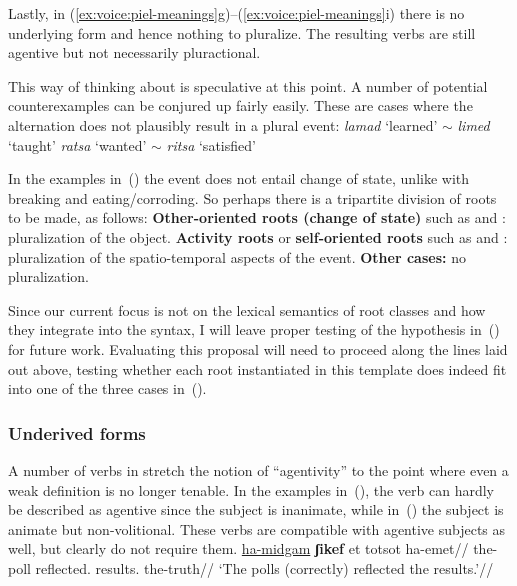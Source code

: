{Lastly, in (\ref{ex:voice:piel-meanings}g)--(\ref{ex:voice:piel-meanings}i) there is no underlying form and hence nothing to pluralize. The resulting verbs are still agentive but not necessarily pluractional.

This way of thinking about {\tpie} is speculative at this point. A number of potential counterexamples can be conjured up fairly easily. These are cases where the alternation does not plausibly result in a plural event:
\pex
	\a \emph{lamad} `learned' $\sim$ \emph{limed} `taught'
	\a \emph{ratsa} `wanted' $\sim$ \emph{ritsa} `satisfied'
\xe

In the examples in~(\lastx) the event does not entail change of state, unlike with breaking and eating/corroding. So perhaps there is a tripartite division of roots to be made, as follows:
\pex
	\a \textbf{Other-oriented roots (change of state)} such as  and : pluralization of the object.
	\a \textbf{Activity roots} or \textbf{self-oriented roots} such as  and : pluralization of the spatio-temporal aspects of the event.
	\a \textbf{Other cases:} no pluralization.
\xe

Since our current focus is not on the lexical semantics of root classes and how they integrate into the syntax, I will leave proper testing of the hypothesis in~(\lastx) for future work. Evaluating this proposal will need to proceed along the lines laid out above, testing whether each root instantiated in this template does indeed fit into one of the three cases in~(\lastx).

		\subsubsection{Underived forms} \label{voice:va:sem:underived}
A number of verbs in {\tpie} stretch the notion of ``agentivity'' to the point where even a weak definition is no longer tenable. In the examples in~(\nextx), the verb can hardly be described as agentive since the subject is inanimate, while in~(\anextx) the subject is animate but non-volitional. These verbs are compatible with agentive subjects as well, but clearly do not require them.
\pex
  \a \begingl
    \gla \underline{ha-midgam} \textbf{ʃikef} et totsot ha-emet//
    \glb the-poll reflected.  results. the-truth//
    \glft `The polls (correctly) reflected the results.'//
  \endgl
    
}
